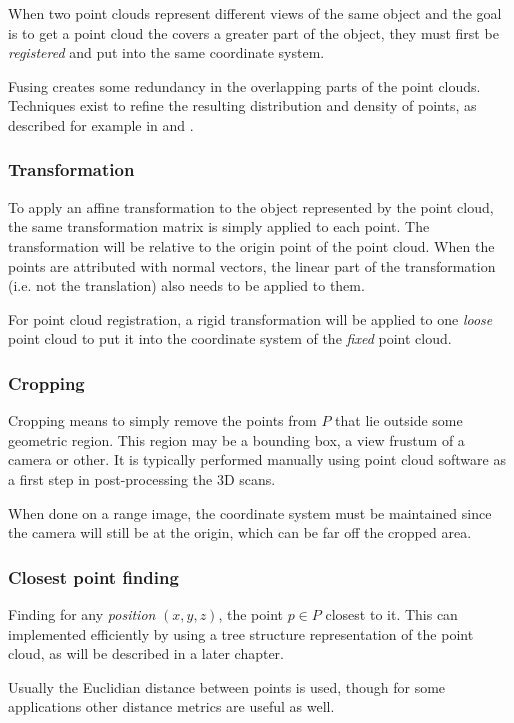 When two point clouds represent different views of the same object and the goal is to get a point cloud the covers a greater part of the object, they must first be \emph{registered} and put into the same coordinate system.

Fusing creates some redundancy in the overlapping parts of the point clouds. Techniques exist to refine the resulting distribution and density of points, as described for example in \cite{Fuhr2011} and \cite{Kyos2013}.


\subsubsection{Transformation}
To apply an affine transformation to the object represented by the point cloud, the same transformation matrix is simply applied to each point. The transformation will be relative to the origin point of the point cloud. When the points are attributed with normal vectors, the linear part of the transformation (i.e. not the translation) also needs to be applied to them.

For point cloud registration, a rigid transformation will be applied to one \emph{loose} point cloud to put it into the coordinate system of the \emph{fixed} point cloud.


\subsubsection{Cropping}
Cropping means to simply remove the points from $P$ that lie outside some geometric region. This region may be a bounding box, a view frustum of a camera or other. It is typically performed manually using point cloud software as a first step in post-processing the 3D scans.

When done on a range image, the coordinate system must be maintained since the camera will still be at the origin, which can be far off the cropped area.


\subsubsection{Closest point finding}
Finding for any \emph{position} $(x, y, z)$, the point $p \in P$ closest to it. This can implemented efficiently by using a tree structure representation of the point cloud, as will be described in a later chapter.

Usually the Euclidian distance between points is used, though for some applications other distance metrics are useful as well.


